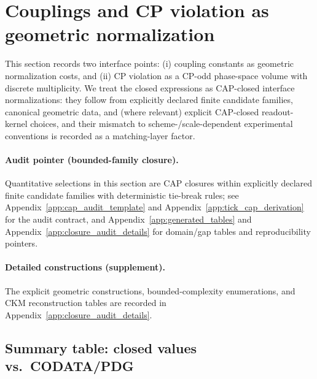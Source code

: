 \section{Couplings and CP violation as geometric normalization}
\label{sec:couplings_cp}

This section records two interface points: (i) coupling constants as geometric normalization costs, and (ii) CP violation as a CP-odd phase-space volume with discrete multiplicity.
We treat the closed expressions as CAP-closed interface normalizations: they follow from explicitly declared finite candidate families, canonical geometric data, and (where relevant) explicit CAP-closed readout-kernel choices, and their mismatch to scheme-/scale-dependent experimental conventions is recorded as a matching-layer factor.

\paragraph{Audit pointer (bounded-family closure).}
\AuditTag Quantitative selections in this section are CAP closures within explicitly declared finite candidate families with deterministic tie-break rules; see Appendix~\ref{app:cap_audit_template} and Appendix~\ref{app:tick_cap_derivation} for the audit contract, and Appendix~\ref{app:generated_tables} and Appendix~\ref{app:closure_audit_details} for domain/gap tables and reproducibility pointers.

\paragraph{Detailed constructions (supplement).}
The explicit geometric constructions, bounded-complexity enumerations, and CKM reconstruction tables are recorded in Appendix~\ref{app:closure_audit_details}.

\subsection{Summary table: closed values vs.\ CODATA/PDG}
\label{subsec:summary_table}

